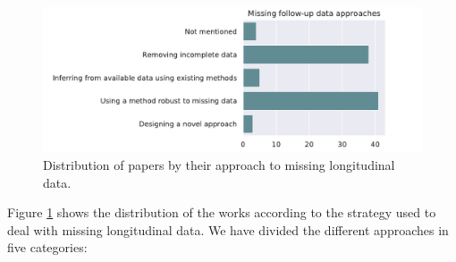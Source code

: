 \begin{figure}[!htbp]
     \centering
     \includegraphics[width=1.0\textwidth]{figures/review/Fig7.pdf}
     \caption{Distribution of papers by their approach to missing longitudinal data.}
     \label{fig:missingfoll}

\end{figure}

Figure \ref{fig:missingfoll} shows the distribution of the works according to the strategy used to deal with missing longitudinal data. We have divided the different approaches in five categories: \\

